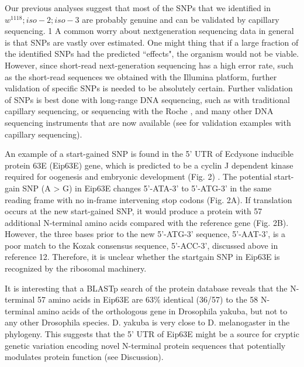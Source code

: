 Our previous analyses suggest that most of the SNPs that we identified in $w^{1118} ; iso-2; iso-3$ are probably genuine and can be validated by capillary sequencing. 1 A common worry about nextgeneration sequencing data in general is that SNPs are vastly over estimated. One might thing that if a large fraction of the identified SNPs had the predicted ``effects", the organism would not be viable. However, since short-read next-generation sequencing has a high error rate, such as the short-read sequences we obtained with the Illumina platform, further validation of specific SNPs is needed to be absolutely certain. Further validation of SNPs is best done with long-range DNA sequencing, such as with traditional capillary sequencing, or sequencing with the Roche \cite{wheeler2008complete}, and many other DNA sequencing instruments that are now available \cite{schadt2011first} (see \cite{platts2009massively} for validation examples with capillary sequencing).

An example of a start-gained SNP is found in the 5' UTR of Ecdysone inducible protein 63E (Eip63E) gene, which is predicted to be a cyclin J dependent kinase required for oogenesis and embryonic development (Fig. 2) \cite{liu2010cyclin}. The potential start-gain SNP (A > G) in Eip63E changes 5'-ATA-3' to 5'-ATG-3' in the same reading frame with no in-frame intervening stop codons (Fig.  2A). If translation occurs at the new start-gained SNP, it would produce a protein with 57 additional N-terminal amino acids compared with the reference gene (Fig. 2B). However, the three bases prior to the new 5'-ATG-3' sequence, 5'-AAT-3', is a poor match to the Kozak consensus sequence, 5'-ACC-3', discussed above in reference 12. Therefore, it is unclear whether the startgain SNP in Eip63E is recognized by the ribosomal machinery.

It is interesting that a BLASTp search of the protein database reveals that the N-terminal 57 amino acids in Eip63E are 63\% identical (36/57) to the 58 N-terminal amino acids of the orthologous gene in Drosophila yakuba, but not to any other Drosophila species. D. yakuba is very close to D. melanogaster in the phylogeny. This suggests that the 5' UTR of Eip63E might be a source for cryptic genetic variation encoding novel N-terminal protein sequences that potentially modulates protein function (see Discussion).

